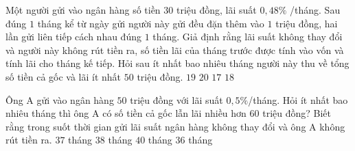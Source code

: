 \begin{ex}
	Một người gửi vào ngân hàng số tiền $30$ triệu đồng, lãi suất $0{,}48\%$ /tháng. Sau đúng $1$ tháng kể từ ngày gửi người này gửi đều đặn thêm vào $1$ triệu đồng, hai lần gửi liên tiếp cách nhau đúng $1$ tháng. Giả định rằng lãi suất không thay đổi và người này không rút tiền ra, số tiền lãi của tháng trước được tính vào vốn và tính lãi cho tháng kế tiếp. Hỏi sau ít nhất bao nhiêu tháng người này thu về tổng số tiền cả gốc và lãi ít nhất $50$ triệu đồng.
	\choice
	{$19$}
	{$20$}
	{$17$}
	{\True $18$}
\end{ex}
\begin{ex}
	Ông A gửi vào ngân hàng $50$ triệu đồng với lãi suất $0{,}5\%$/tháng. Hỏi ít nhất bao nhiêu tháng thì ông A có số tiền cả gốc lẫn lãi nhiều hơn $60$ triệu đồng? Biết rằng trong suốt thời gian gửi lãi suất ngân hàng không thay đổi và ông A không rút tiền ra.
	\choice
	{\True $37$ tháng}
	{$38$ tháng}
	{$40$ tháng}
	{$36$ tháng}
\end{ex}
